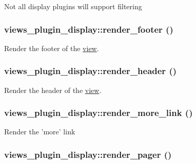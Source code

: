 Not all display plugins will support filtering \hypertarget{classviews__plugin__display_4b2a49cfccca396da8206e95fddadc0a}{
\subsubsection[{render\_\-footer}]{\setlength{\rightskip}{0pt plus 5cm}views\_\-plugin\_\-display::render\_\-footer ()}}
\label{classviews__plugin__display_4b2a49cfccca396da8206e95fddadc0a}


Render the footer of the \hyperlink{classview}{view}. \hypertarget{classviews__plugin__display_3c0302020ed6b1e8d6a0be40760533d6}{
\subsubsection[{render\_\-header}]{\setlength{\rightskip}{0pt plus 5cm}views\_\-plugin\_\-display::render\_\-header ()}}
\label{classviews__plugin__display_3c0302020ed6b1e8d6a0be40760533d6}


Render the header of the \hyperlink{classview}{view}. \hypertarget{classviews__plugin__display_d680ce0ae6e6ed738ab9018f34e05703}{
\subsubsection[{render\_\-more\_\-link}]{\setlength{\rightskip}{0pt plus 5cm}views\_\-plugin\_\-display::render\_\-more\_\-link ()}}
\label{classviews__plugin__display_d680ce0ae6e6ed738ab9018f34e05703}


Render the 'more' link \hypertarget{classviews__plugin__display_0594f29620ea589280dee099666623c3}{
\subsubsection[{render\_\-pager}]{\setlength{\rightskip}{0pt plus 5cm}views\_\-plugin\_\-display::render\_\-pager ()}}
\label{classviews__plugin__display_0594f29620ea589280dee099666623c3}


